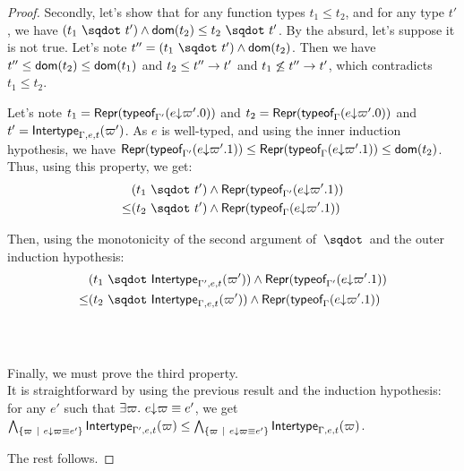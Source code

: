 \documentclass[a4paper]{article}
\theoremstyle{definition}
\begin{document}
\begin{proof}
  Secondly, let's show that for any function types $t_1 \leq t_2$, and for any type $t'$,
  we have $(\worra {t_1} {t'}) \land \dom {t_2} \leq \worra {t_2} {t'}$. By the absurd, let's suppose it is not true.
  Let's note $t'' = (\worra {t_1} {t'}) \land \dom {t_2}$.
  Then we have $t'' \leq \dom {t_2} \leq \dom {t_1}$ and $t_2 \leq \arrow {t''} {t'}$ and
  $t_1 \not\leq \arrow {t''} {t'}$, which contradicts $t_1 \leq t_2$.

  Let's note $t_1 = \tsrep {\tyof{\occ e{\varpi'.0}}{\Gamma'}}$ and $t_2 = \tsrep {\tyof{\occ e{\varpi'.0}}\Gamma}$
  and $t'=\env {\Gamma,e,t} (\varpi')$.
  As $e$ is well-typed, and using the inner induction hypothesis, we have $\tsrep {\tyof {\occ e {\varpi'.1}} {\Gamma'}} \leq \tsrep {\tyof {\occ e {\varpi'.1}} {\Gamma}} \leq \dom {t_2}$.\\
  Thus, using this property, we get:\\
  \begin{align*}
  &(\worra {t_1} {t'}) \land \tsrep {\tyof {\occ e {\varpi'.1}} {\Gamma'}}\\
  \leq &(\worra {t_2} {t'}) \land \tsrep {\tyof {\occ e {\varpi'.1}} {\Gamma}}
  \end{align*}

  Then, using the monotonicity of the second argument of $\worra {}{}$ and the outer induction hypothesis:
  \begin{align*}
    &(\worra {t_1} {\env {\Gamma',e,t} (\varpi')}) \land \tsrep {\tyof {\occ e {\varpi'.1}} {\Gamma'}}\\
    \leq &(\worra {t_2} {\env {\Gamma,e,t} (\varpi')}) \land \tsrep {\tyof {\occ e {\varpi'.1}} {\Gamma}}
  \end{align*}
  \\

  \ 

  Finally, we must prove the third property.\\
  It is straightforward by using the previous result and the induction hypothesis:\\
  for any $e'$ such that $\exists \varpi.\ \occ e \varpi \equiv e'$, we get
  $\bigwedge_{\{\varpi\alt \occ e \varpi \equiv e'\}} \env {\Gamma',e,t} (\varpi) \leq \bigwedge_{\{\varpi\alt \occ e \varpi \equiv e'\}} \env {\Gamma,e,t} (\varpi)$.

  The rest follows.
  \end{proof}
\end{document}
